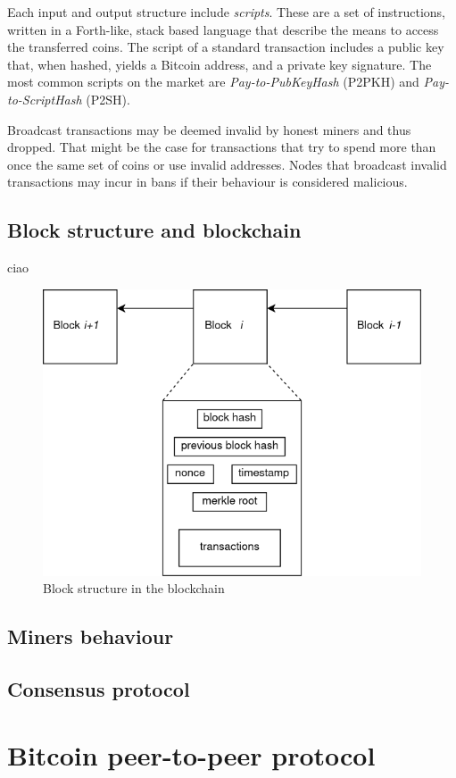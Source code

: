 \documentclass[12pt, letterpaper, twoside]{article}
\begin{document}
Each input and output structure include \emph{scripts}. These are a set of instructions, written in a Forth-like, stack based language that describe the means to access the transferred coins. The script of a standard transaction includes a public key that, when hashed, yields a Bitcoin address, and a private key signature. The most common scripts on the market are \emph{Pay-to-PubKeyHash} (P2PKH) and \emph{Pay-to-ScriptHash} (P2SH).

Broadcast transactions may be deemed invalid by honest miners and thus dropped. That might be the case for transactions that try to spend more than once the same set of coins or use invalid addresses. Nodes that broadcast invalid transactions may incur in bans if their behaviour is considered malicious.

\subsection{Block structure and blockchain}\label{sec:block}
 ciao
 
\begin{figure}[h!]
	\includegraphics[width=.55\textwidth]{pict/blockstruct.png}
	\centering
	\caption{Block structure in the blockchain}
	\label{fig:blockstrcut}
\end{figure}

\subsection{Miners behaviour}\label{sec:miners}
\subsection{Consensus protocol}\label{sec:consensus}

\section{Bitcoin peer-to-peer protocol}\label{sec:netintro}
\end{document}
